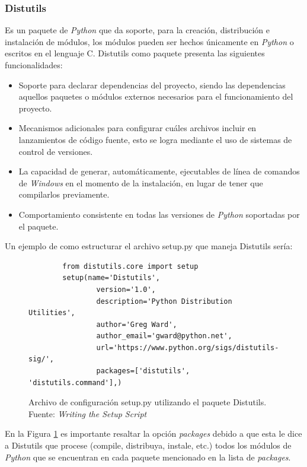 \subsubsection{Distutils}
Es un paquete de \textit{Python} que da soporte, para la creación, distribución e instalación de módulos, los módulos pueden ser hechos únicamente en \textit{Python} o escritos en el lenguaje C. Distutils como paquete presenta las siguientes funcionalidades:
\begin{itemize}
    \item Soporte para declarar dependencias del proyecto, siendo las dependencias aquellos paquetes o módulos externos necesarios para el funcionamiento del proyecto.
    \item Mecanismos adicionales para configurar cuáles archivos incluir en lanzamientos de código fuente, esto se logra mediante el uso de sistemas de control de versiones.
    \item La capacidad de generar, automáticamente, ejecutables de línea de comandos de \textit{Windows} en el momento de la instalación, en lugar de tener que compilarlos previamente.
    \item Comportamiento consistente en todas las versiones de \textit{Python} soportadas por el paquete.
\end{itemize}
Un ejemplo de como estructurar el archivo setup.py que maneja Distutils sería:
\begin{figure}[H]
    \begin{verbatim}
		from distutils.core import setup
		setup(name='Distutils',
                version='1.0',
                description='Python Distribution Utilities',
                author='Greg Ward',
                author_email='gward@python.net',
                url='https://www.python.org/sigs/distutils-sig/',
                packages=['distutils', 'distutils.command'],)
	\end{verbatim}
    \caption[Archivo de configuración setup.py utilizando el paquete Distutils.]{Archivo de configuración setup.py utilizando el paquete Distutils. {\footnotesize Fuente: \textit{Writing the Setup Script} \cite{python-software-foundation}}}
    \label{ejDistutils}
\end{figure}
En la Figura \ref{ejDistutils} es importante resaltar la opción \textit{packages} debido a que esta le dice a Distutils que procese (compile, distribuya, instale, etc.) todos los módulos de \textit{Python} que se encuentran en cada paquete mencionado en la lista de \textit{packages}.
